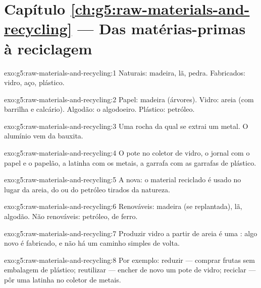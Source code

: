 \section*{Capítulo \ref{ch:g5:raw-materials-and-recycling} --- Das matérias-primas à reciclagem}

\begin{solution}{exo:g5:raw-materials-and-recycling:1}
Naturais: madeira, lã, pedra. Fabricados: vidro, aço, plástico.
\end{solution}

\begin{solution}{exo:g5:raw-materials-and-recycling:2}
Papel: madeira (árvores). Vidro: areia (com barrilha e calcário).
Algodão: o algodoeiro. Plástico: petróleo.
\end{solution}

\begin{solution}{exo:g5:raw-materials-and-recycling:3}
Uma rocha da qual se extrai um metal. O alumínio vem da bauxita.
\end{solution}

\begin{solution}{exo:g5:raw-materials-and-recycling:4}
O pote no coletor de vidro, o jornal com o papel e o papelão, a latinha
com os metais, a garrafa com as garrafas de plástico.
\end{solution}

\begin{solution}{exo:g5:raw-materials-and-recycling:5}
A  nova: o material reciclado é usado no lugar da areia, do
 ou do petróleo tirados da natureza.
\end{solution}

\begin{solution}{exo:g5:raw-materials-and-recycling:6}
Renováveis: madeira (se replantada), lã, algodão. Não renováveis:
petróleo,  de ferro.
\end{solution}

\begin{solution}{exo:g5:raw-materials-and-recycling:7}
Produzir vidro a partir de areia é uma : algo novo
é fabricado, e não há um caminho simples de volta.
\end{solution}

\begin{solution}{exo:g5:raw-materials-and-recycling:8}
Por exemplo: reduzir --- comprar frutas sem embalagem de plástico;
reutilizar --- encher de novo um pote de vidro; reciclar --- pôr uma
latinha no coletor de metais.
\end{solution}

